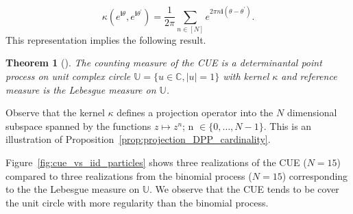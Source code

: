 \documentclass[twoside,11pt]{book}
\newtheorem{theorem}{Theorem}
\numberwithin{theorem}{chapter}
\numberwithin{definition}{chapter}
\numberwithin{proposition}{chapter}
\numberwithin{corollary}{chapter}
\numberwithin{example}{chapter}
\numberwithin{lemma}{chapter}
\begin{document}
\begin{equation}
\kappa(e^{\mathbf{i}\theta},e^{\mathbf{i}\theta^{'}}) = \frac{1}{2 \pi}\sum\limits_{n \in [N]} e^{2 \pi n \mathbf{i}(\theta-\theta^{'})}.
\end{equation}
This representation implies the following result.
\begin{theorem}[\cite{Dys62}]\label{thm:CUE_is_DPP}
The counting measure of the CUE is a determinantal point process on unit complex circle $\mathbb{U} = \{ u \in \mathbb{C}, |u| =1 \}$ with kernel $\kappa$ and reference measure is the Lebesgue measure on $\mathbb{U}$.

\end{theorem}

Observe that the kernel $\kappa$ defines a projection operator into the $N$ dimensional subspace spanned by the functions $z \mapsto z^{n}$; n $\in \{0, \dots, N-1 \}$. This is an illustration of Proposition~\ref{prop:projection_DPP_cardinality}. 

Figure~\ref{fig:cue_vs_iid_particles} shows three realizations of the CUE ($N = 15$) compared to three realizations from the binomial process ($N = 15$) corresponding to the the Lebesgue measure on $\mathbb{U}$. We observe that the CUE tends to be cover the unit circle with more regularity than the binomial process.




\end{document}
